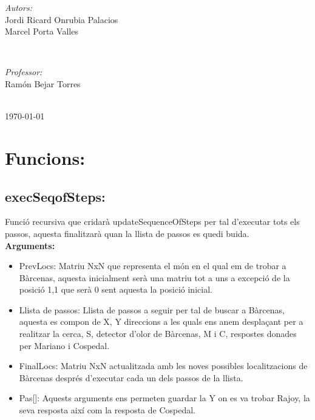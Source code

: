 \documentclass[11pt]{article}
\begin{document}
\begin{titlepage}
		\begin{minipage}{0.4\textwidth}
			\begin{flushleft} \large
				\emph{Autors:}\\
				Jordi Ricard Onrubia Palacios\\
				Marcel Porta Valles
			\end{flushleft}
		\end{minipage}
		~
		\begin{minipage}{0.4\textwidth}
			\begin{flushright} \large
				\emph{Professor:} \\
				Ramón Bejar Torres
			\end{flushright}
		\end{minipage}\\[4cm]
		
		{\large \today}\\[3cm] %
		\vfill %
	\end{titlepage}
\newpage
\thispagestyle{empty}
\newpage
\tableofcontents
\listoffigures
\newpage
\clearpage
{}
\section{Funcions:}
\subsection{execSeqofSteps:}
Funció recursiva que cridarà updateSequenceOfSteps per tal d'executar tots els passos, aquesta finalitzarà quan la llista de passos es quedi buida.\\
\textbf{Arguments:}
\begin{itemize}
\item PrevLocs: Matriu NxN que representa el món en el qual em de trobar a Bàrcenas, aquesta inicialment serà una matriu tot a uns a excepció de la posició 1,1 que serà 0 sent aquesta la posició inicial.
\item Llista de passos: Llista de passos a seguir per tal de buscar a Bàrcenas, aquesta es compon de X, Y direccions a les quals ens anem desplaçant per a realitzar la cerca, S, detector d'olor de Bàrcenas, M i C, respostes donades per Mariano i Cospedal.
\item FinalLocs: Matriu NxN actualitzada amb les noves possibles localitzacions de Bàrcenas després d'executar cada un dels passos de la llista.
\item Pas[]: Aquests arguments ens permeten guardar la Y on es va trobar Rajoy, la seva resposta així com la resposta de Cospedal.
\end{itemize}
\end{document}
